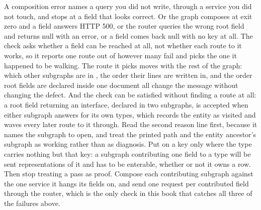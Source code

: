 \begin{problemsummary}
{A composition error names a query you did not write, through a service you did
not touch, and stops at a field that looks correct. Or the graph composes at
exit zero and a field answers HTTP 500, or the router queries the wrong root
field and returns null with an error, or a field comes back null with no
 key at all.}
{The check asks whether a field can be reached at all, not whether each route
to it works, so it reports one route out of however many fail and picks the one
it happened to be walking. The route it picks moves with the rest of the graph:
which other subgraphs are in , the order their lines are
written in, and the order root fields are declared inside one document all
change the message without changing the defect. And the check can be satisfied
without finding a route at all: a root field returning an interface, declared
 in two subgraphs, is accepted when either subgraph answers
for its own types, which records the entity as visited and waves every later
route to it through.}
{Read the second reason line first, because it names the subgraph to open, and
treat the printed path and the entity ancestor's subgraph as working rather
than as diagnosis. Put  on a key only where the type
carries nothing but that key: a subgraph contributing one field to a type will
be sent representations of it and has to be enterable, whether or not it owns a
row. Then stop treating a pass as proof. Compose each contributing subgraph
against the one service it hangs its fields on, and send one request per
contributed field through the router, which is the only check in this book that
catches all three of the failures above.}
\end{problemsummary}
